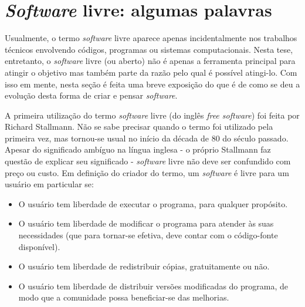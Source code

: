 



\section{\textit{Software} livre: algumas palavras}

Usualmente, o termo \textit{software} livre aparece apenas incidentalmente nos trabalhos
técnicos envolvendo códigos, programas ou sistemas computacionais. Nesta tese, entretanto,
o \textit{software} livre (ou aberto) não é apenas a ferramenta principal para atingir o objetivo
mas também parte da razão pelo qual é possível atingi-lo. Com isso em mente, nesta seção é
feita uma breve exposição do que é de como se deu a evolução desta forma de criar e pensar
\textit{software}.

A primeira utilização do termo \textit{software} livre (do inglês \textit{free software})
foi feita por Richard Stallmann. Não se sabe precisar quando o termo foi utilizado pela
primeira vez, mas tornou-se usual no início da década de 80 do século passado.
Apesar do significado ambíguo na língua inglesa - o próprio Stallmann faz questão
de explicar seu significado \cite{Stallman2002} - \textit{software} livre não deve
ser confundido com preço ou custo. Em definição do criador do termo, um \textit{software}
é livre para um usuário em particular se:
\begin{itemize}
\item O usuário tem liberdade de executar o programa, para qualquer propósito.
\item O usuário tem liberdade de modificar o programa para atender às suas necessidades
  (que para tornar-se efetiva, deve contar com o código-fonte disponível).
\item O usuário tem liberdade de redistribuir cópias, gratuitamente ou não.
\item O usuário tem liberdade de distribuir versões modificadas do programa, de modo
  que a comunidade possa beneficiar-se das melhorias.
\end{itemize}

